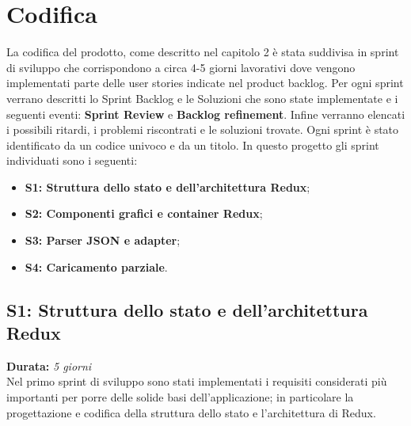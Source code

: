 
\chapter{Codifica}
\label{cap:codifica}

La codifica del prodotto, come descritto nel capitolo 2 è stata suddivisa in sprint di sviluppo che corrispondono a circa 4-5 giorni lavorativi dove vengono implementati parte delle user stories indicate nel product backlog. Per ogni sprint verrano descritti lo Sprint Backlog e le Soluzioni che sono state implementate e i seguenti eventi: \textbf{Sprint Review} e \textbf{Backlog refinement}.
Infine verranno elencati i possibili ritardi, i problemi riscontrati e le soluzioni trovate. Ogni sprint è stato identificato da un codice univoco e da un titolo. In questo progetto gli sprint individuati sono i seguenti:
\begin{itemize}
	\item \textbf{S1: Struttura dello stato e dell'architettura Redux};
	\item \textbf{S2: Componenti grafici e container Redux};
	\item \textbf{S3: Parser JSON e adapter};
	\item \textbf{S4: Caricamento parziale}.
\end{itemize}

\section{S1: Struttura dello stato e dell'architettura Redux}
\textbf{Durata:} \textit{5 giorni} \\
Nel primo sprint di sviluppo sono stati implementati i requisiti considerati più importanti per porre delle solide basi dell'applicazione; in particolare la progettazione e codifica della struttura dello stato e l'architettura di Redux.

